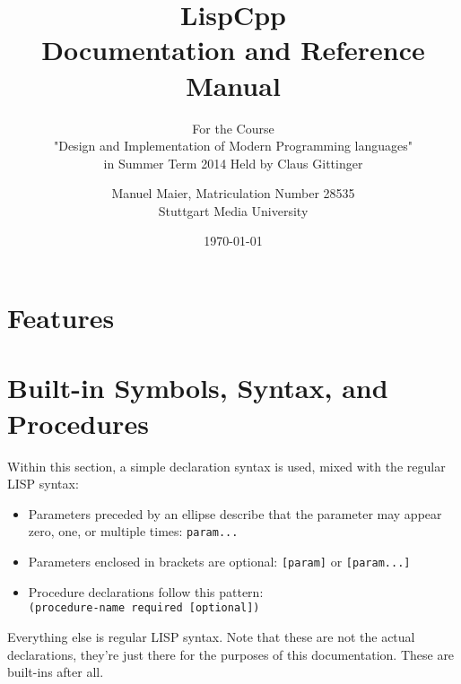 \documentclass[a4paper]{scrartcl}
\title{LispCpp\\
	Documentation and Reference Manual}
\subtitle{For the Course\\
	"Design and Implementation of Modern Programming languages"\\
	in Summer Term 2014 Held by Claus Gittinger}
\author{Manuel Maier, Matriculation Number 28535\\
		Stuttgart Media University}
\date{\today}
\begin{document}
\maketitle
\tableofcontents
\clearpage

\section{Features}
	
\section{Built-in Symbols, Syntax, and Procedures}
	Within this section, a simple declaration syntax is used, mixed with the regular LISP syntax:
	
	\begin{itemize}
		\item Parameters preceded by an ellipse describe that the parameter may appear zero, one, or multiple times: \lstinline|param...|
		\item Parameters enclosed in brackets are optional: \lstinline|[param]| or \lstinline|[param...]|
		\item Procedure declarations follow this pattern:\\
			  \lstinline|(procedure-name required [optional])|
	\end{itemize}

	Everything else is regular LISP syntax. Note that these are not the actual declarations, they're just there for the purposes of this documentation. These are built-ins after all.

	

	
	
	
	
	
	
	
	

	
	
	
	
	
	
	
	
	
	
\end{document}

